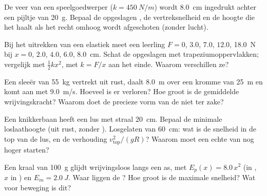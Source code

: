 \begin{exercise}[$\star\star$]\label{exo:g12:work-and-energy:6}
De veer van een speelgoedwerper ($k = \qty{450}{N/m}$) wordt \qty{8.0}{cm}
ingedrukt achter een pijltje van \qty{20}{g}. Bepaal de opgeslagen , de
vertreksnelheid en de hoogte die het haalt als het recht omhoog wordt
afgeschoten (zonder lucht).
\end{exercise}

\begin{exercise}[$\star\star$]\label{exo:g12:work-and-energy:7}
Bij het uitrekken van een elastiek meet een leerling $F = 0$, $3.0$, $7.0$,
$12.0$, \qty{18.0}{N} bij $x = 0$, $2.0$, $4.0$, $6.0$, \qty{8.0}{cm}. Schat
de opgeslagen  met trapeziumoppervlakken; vergelijk met
$\tfrac12 kx^2$, met $k = F/x$ aan het einde. Waarom verschillen ze?
\end{exercise}

\begin{exercise}[$\star\star$]\label{exo:g12:work-and-energy:8}
Een sleeër van \qty{55}{kg} vertrekt uit rust, daalt \qty{8.0}{m} over een
kromme  van \qty{25}{m} en komt aan met \qty{9.0}{m/s}. Hoeveel
 is er verloren? Hoe groot is de gemiddelde
wrijvingskracht? Waarom doet de precieze vorm van de  niet ter zake?
\end{exercise}

\begin{exercise}[$\star\star$]\label{exo:g12:work-and-energy:9}
Een knikkerbaan heeft een lus met straal \qty{20}{cm}. Bepaal de minimale
loslaathoogte (uit rust, zonder ). Losgelaten van \qty{60}{cm}: wat is
de snelheid in de top van de lus, en de verhouding $v_{\text{top}}^2/(gR)$?
Waarom moet een echte  van nog hoger starten?
\end{exercise}

\begin{exercise}[$\star\star$]\label{exo:g12:work-and-energy:10}
Een kraal van \qty{100}{g} glijdt wrijvingsloos langs een as, met
$E_p(x) = 8.0\,x^2$ (in , $x$ in ) en $E_m = \qty{2.0}{J}$. Waar
liggen de ? Hoe groot is de maximale snelheid? Wat voor beweging is
dit?
\end{exercise}


